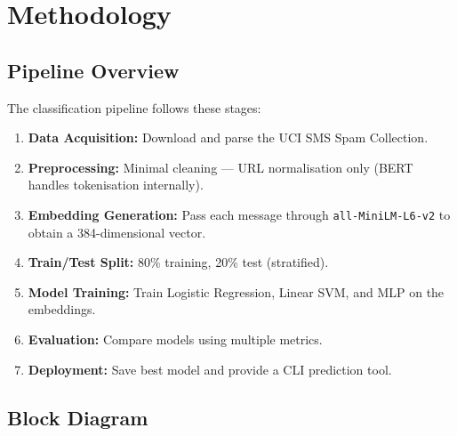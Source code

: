 \documentclass[12pt,a4paper]{article}
\begin{document}
\section{Methodology}

\subsection{Pipeline Overview}
The classification pipeline follows these stages:

\begin{enumerate}[leftmargin=1.5cm]
    \item \textbf{Data Acquisition:} Download and parse the UCI SMS Spam Collection.
    \item \textbf{Preprocessing:} Minimal cleaning --- URL normalisation only (BERT handles tokenisation internally).
    \item \textbf{Embedding Generation:} Pass each message through \texttt{all-MiniLM-L6-v2} to obtain a 384-dimensional vector.
    \item \textbf{Train/Test Split:} 80\% training, 20\% test (stratified).
    \item \textbf{Model Training:} Train Logistic Regression, Linear SVM, and MLP on the embeddings.
    \item \textbf{Evaluation:} Compare models using multiple metrics.
    \item \textbf{Deployment:} Save best model and provide a CLI prediction tool.
\end{enumerate}

\subsection{Block Diagram}
\end{document}
